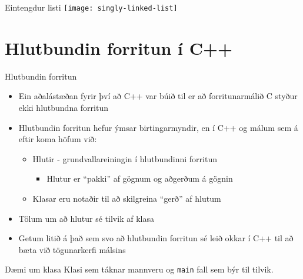 \documentclass{beamer}
\begin{document}
\begin{frame}{Eintengdur listi}
    \texttt{[image: singly-linked-list]}
\end{frame}

\section{Hlutbundin forritun í C++}

\begin{frame}{Hlutbundin forritun}
    \begin{itemize}
        \item Ein aðalástæðan fyrir því að C++ var búið til er að forritunarmálið C styður ekki hlutbundna forritun
        \item Hlutbundin forritun hefur ýmsar birtingarmyndir, en í C++ og málum sem á eftir koma höfum við:
        \begin{itemize}
            \item Hlutir  - grundvallareiningin í hlutbundinni forritun
            \begin{itemize}
                \item Hlutur er ``pakki'' af gögnum og aðgerðum á gögnin
            \end{itemize}
            \item Klasar  eru notaðir til að skilgreina ``gerð'' af hlutum 
        \end{itemize}
        \item Tölum um að hlutur sé tilvik  af klasa
        \item Getum litið á það sem svo að hlutbundin forritun sé leið okkar í C++ til að bæta við tögunarkerfi málsins
    \end{itemize}
\end{frame}

\begin{frame}{Dæmi um klasa}
    Klasi sem táknar mannveru og \texttt{main} fall sem býr til tilvik.
    \begin{columns}
    \end{columns}
\end{frame}
\end{document}
